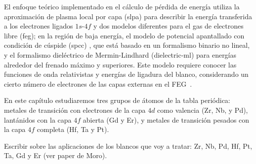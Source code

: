 El enfoque teórico implementado en el cálculo de pérdida de energía 
utiliza la aproximación de plasma local por capa (\acs{slpa}) 
\cite{Montanari:13} para describir la energía transferida a los 
electrones ligados $1s$-$4f$ y dos modelos diferentes para el gas de 
electrones libre (\acs{feg}); en la región de baja energía, el modelo 
de potencial apantallado con condición de cúspide (\acs{spcc}) 
\cite{Montanari:17}, que está basado en un formalismo binario no lineal, 
y el formalismo dieléctrico de Mermin-Lindhard (\acs{dielectric-ml}) 
\cite{Mermin:70} para energías alrededor del frenado máximo y 
superiores. Este modelo requiere conocer las funciones de onda 
relativistas y energías de ligadura del blanco, considerando un cierto 
número de electrones de las capas externas en el FEG~\cite{Mendez:19}. 

En este capítulo estudiaremos tres grupos de átomos de la tabla 
periódica: metales de transición con electrones de la capa $4d$ como 
valencia (Zr, Nb, y Pd), lantánidos con la capa $4f$ abierta (Gd y Er), 
y metales de transición pesados con la capa $4f$ completa (Hf, Ta y Pt). 

{\color{red} Escribir sobre las aplicaciones de los blancos que voy a 
tratar: Zr, Nb, Pd, Hf, Pt, Ta, Gd y Er  (ver paper de Moro).}


